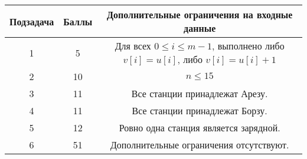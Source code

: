 \begin{center}
\renewcommand{\arraystretch}{1.5}
\begin{tabular}{|c|c|c|}
\hline
Подзадача & Баллы & Дополнительные ограничения на входные данные\\
\hline
1 &  5 & Для всех $0 \le i \le m - 1$, выполнено либо $v[i] = u[i]$, либо $v[i] = u[i] + 1$ \\
\hline
2 & 10 & $n \leq 15$ \\
\hline
3 & 11 & Все станции принадлежат Арезу. \\
\hline
4 & 11 & Все станции принадлежат Борзу. \\
\hline
5 & 12 &  Ровно одна станция является зарядной. \\
\hline
6 & 51 & Дополнительные ограничения отсутствуют. \\
\hline
\end{tabular}
\end{center}